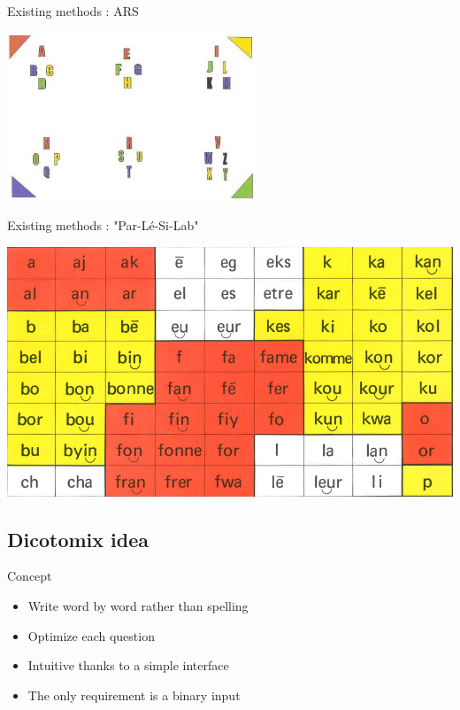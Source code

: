 \documentclass[notes]{beamer}
\begin{document}
\begin{frame}{Existing methods : ARS}
	\begin{center}
		\includegraphics[scale=0.9]{tableau_lettres_transparent}
	\end{center}
\end{frame}

\begin{frame}{Existing methods : "Par-Lé-Si-Lab"}
	\begin{center}
		\includegraphics[scale=0.3]{parler_syllabes}
	\end{center}
\end{frame}

\subsection{Dicotomix idea}
\begin{frame}{Concept}
	\begin{center}
		\begin{itemize}
			\item Write word by word rather than spelling
			\item Optimize each question
			\item Intuitive thanks to a simple interface
			\item The only requirement is a binary input
		\end{itemize}
	\end{center}
\end{frame}
\end{document}
